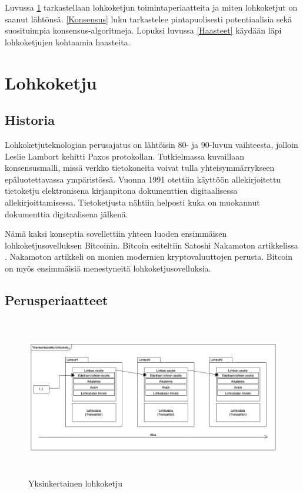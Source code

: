 \documentclass[utf8,bachelor]{gradu3}
\begin{document}
Luvussa \ref{Lohkoketju} tarkastellaan lohkoketjun toimintaperiaatteita ja miten lohkoketjut on saanut lähtönsä.
\ref{Konsensus} luku tarkastelee pintapuolisesti potentiaalisia sekä suosituimpia konsensus-algoritmeja.
Lopuksi luvussa \ref{Haasteet} käydään läpi lohkoketjujen kohtaamia haasteita.



\chapter{Lohkoketju}\label{Lohkoketju}
\section{Historia}

Lohkoketjuteknologian perusajatus on lähtöisin 80- ja 90-luvun vaihteesta, jolloin Leslie Lambort kehitti Paxos protokollan. 
Tutkielmassa kuvaillaan konsensusmalli, missä verkko tietokoneita voivat tulla yhteisymmärrykseen epäluotettavassa ympäristössä.
Vuonna 1991 otettiin käyttöön allekirjoitettu tietoketju elektronisena kirjanpitona dokumenttien digitaalisessa allekirjoittamisessa. Tietoketjusta nähtiin helposti kuka on muokannut dokumenttia digitaalisena jälkenä.

Nämä kaksi konseptia sovellettiin yhteen luoden ensimmäisen lohkoketjusovelluksen Bitcoinin. Bitcoin esiteltiin Satoshi Nakamoton artikkelissa \parencite{nakamoto2008bitcoin}.
Nakamoton artikkeli on monien modernien kryptovaluuttojen perusta.
Bitcoin on myös ensimmäisiä menestyneitä lohkoketjusovelluksia.


\section{Perusperiaatteet}

\begin{figure}[h]\centering
  \includegraphics[height=7cm,keepaspectratio]{lohkoketjuDiag}
  \caption[Yksinkertainen lohkoketju]{Yksinkertainen lohkoketju}
  \label{fig:Lohkoketju}
\end{figure}
\end{document}
